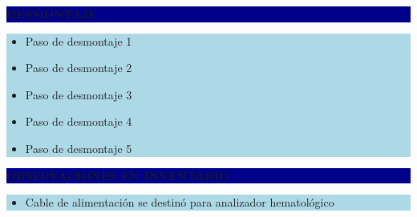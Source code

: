 \documentclass[11pt]{article}
\newcommand{\seccionbanda}[1]{%
  \vspace{0.6em}
  \noindent\colorbox{darkblue}{\parbox{\dimexpr\linewidth-2\fboxsep}{%
    \centering\color{white}\bfseries #1}}\par\vspace{0.6em}
}
\begin{document}
\seccionbanda{DESMONTAJE}
\noindent\colorbox{lightblue}{\parbox{\dimexpr\linewidth-2\fboxsep\relax}{%
\begin{itemize}[label=$\square$, itemsep=4pt]
\item Paso de desmontaje 1
\item Paso de desmontaje 2
\item Paso de desmontaje 3
\item Paso de desmontaje 4
\item Paso de desmontaje 5
\end{itemize}
}}\par
\seccionbanda{OBSERVACIONES EN INVENTARIO}
\noindent\colorbox{lightblue}{\parbox{\dimexpr\linewidth-2\fboxsep\relax}{\begin{itemize}[itemsep=4pt]
\item Cable de alimentación se destinó para analizador hematológico
\end{itemize}}}\par
\end{document}
